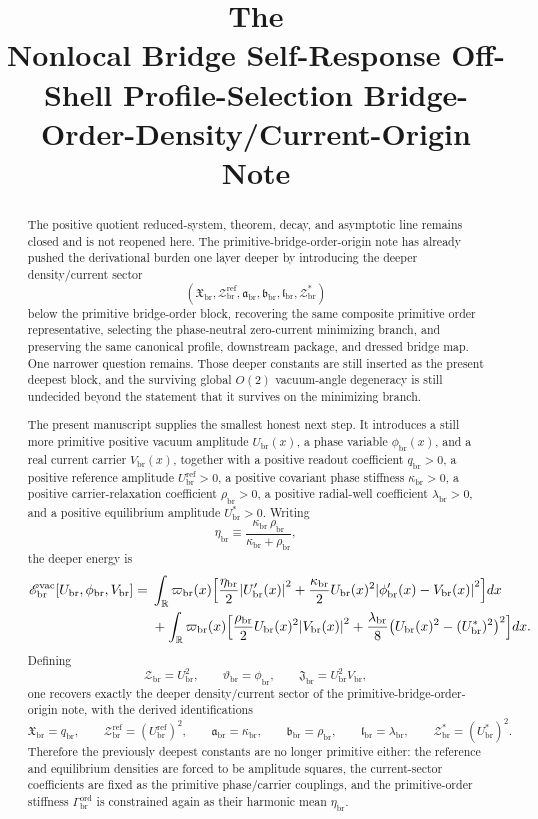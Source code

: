 \documentclass[11pt]{article}
\title{\textbf{The \TheoryName{}}\\[0.4em]
\large Nonlocal Bridge Self-Response Off-Shell Profile-Selection Bridge-Order-Density/Current-Origin Note}
\author{}
\date{}
\newcommand{\ProfWeight}{\varpi_{\mathrm{br}}}
\newcommand{\RespOrderStiff}{\Gamma_{\mathrm{br}}^{\mathrm{ord}}}
\newcommand{\RespOrderPhase}{\vartheta_{\mathrm{br}}}
\newcommand{\RespDeepDensity}{\mathcal Z_{\mathrm{br}}}
\newcommand{\RespDeepDensityRef}{\mathcal Z_{\mathrm{br}}^{\mathrm{ref}}}
\newcommand{\RespDeepDensityEq}{\mathcal Z_{\mathrm{br}}^{\ast}}
\newcommand{\RespDeepReadout}{\mathfrak X_{\mathrm{br}}}
\newcommand{\RespDeepTrack}{\mathfrak a_{\mathrm{br}}}
\newcommand{\RespDeepRelax}{\mathfrak b_{\mathrm{br}}}
\newcommand{\RespDeepWell}{\mathfrak l_{\mathrm{br}}}
\newcommand{\RespDeepAux}{\mathfrak J_{\mathrm{br}}}
\newcommand{\RespVacAmp}{U_{\mathrm{br}}}
\newcommand{\RespVacRef}{U_{\mathrm{br}}^{\mathrm{ref}}}
\newcommand{\RespVacEq}{U_{\mathrm{br}}^{\ast}}
\newcommand{\RespVacPhase}{\phi_{\mathrm{br}}}
\newcommand{\RespVacCarrier}{V_{\mathrm{br}}}
\newcommand{\RespVacReadout}{q_{\mathrm{br}}}
\newcommand{\RespVacCov}{\kappa_{\mathrm{br}}}
\newcommand{\RespVacRelax}{\rho_{\mathrm{br}}}
\newcommand{\RespVacWell}{\lambda_{\mathrm{br}}}
\newcommand{\RespVacIso}{\eta_{\mathrm{br}}}
\newcommand{\RespVacEnergy}{\mathscr E_{\mathrm{br}}^{\mathrm{vac}}}
\begin{document}
\maketitle

\begin{abstract}
The positive quotient reduced-system, theorem, decay, and asymptotic line remains closed and is not reopened here. The primitive-bridge-order-origin note has already pushed the derivational burden one layer deeper by introducing the deeper density/current sector
\[
(\RespDeepReadout,\RespDeepDensityRef,\RespDeepTrack,\RespDeepRelax,\RespDeepWell,\RespDeepDensityEq)
\]
below the primitive bridge-order block, recovering the same composite primitive order representative, selecting the phase-neutral zero-current minimizing branch, and preserving the same canonical profile, downstream package, and dressed bridge map. One narrower question remains. Those deeper constants are still inserted as the present deepest block, and the surviving global \(O(2)\) vacuum-angle degeneracy is still undecided beyond the statement that it survives on the minimizing branch.

The present manuscript supplies the smallest honest next step. It introduces a still more primitive positive vacuum amplitude \(\RespVacAmp(x)\), a phase variable \(\RespVacPhase(x)\), and a real current carrier \(\RespVacCarrier(x)\), together with a positive readout coefficient \(\RespVacReadout>0\), a positive reference amplitude \(\RespVacRef>0\), a positive covariant phase stiffness \(\RespVacCov>0\), a positive carrier-relaxation coefficient \(\RespVacRelax>0\), a positive radial-well coefficient \(\RespVacWell>0\), and a positive equilibrium amplitude \(\RespVacEq>0\). Writing
\[
\RespVacIso\equiv \frac{\RespVacCov\,\RespVacRelax}{\RespVacCov+\RespVacRelax},
\]
the deeper energy is
\begin{align*}
\RespVacEnergy[\RespVacAmp,\RespVacPhase,\RespVacCarrier]
=\;&
\int_{\mathbb R}\ProfWeight(x)\Bigl[
\frac{\RespVacIso}{2}\abs{\RespVacAmp'(x)}^2
+
\frac{\RespVacCov}{2}\RespVacAmp(x)^2\abs{\RespVacPhase'(x)-\RespVacCarrier(x)}^2
\Bigr]dx
\nonumber\\
&+
\int_{\mathbb R}\ProfWeight(x)\Bigl[
\frac{\RespVacRelax}{2}\RespVacAmp(x)^2\abs{\RespVacCarrier(x)}^2
+
\frac{\RespVacWell}{8}\bigl(\RespVacAmp(x)^2-(\RespVacEq)^2\bigr)^2
\Bigr]dx.
\end{align*}
Defining
\[
\RespDeepDensity=\RespVacAmp^2,
\qquad
\RespOrderPhase=\RespVacPhase,
\qquad
\RespDeepAux=\RespVacAmp^2\RespVacCarrier,
\]
one recovers exactly the deeper density/current sector of the primitive-bridge-order-origin note, with the derived identifications
\[
\RespDeepReadout=\RespVacReadout,
\qquad
\RespDeepDensityRef=(\RespVacRef)^2,
\qquad
\RespDeepTrack=\RespVacCov,
\qquad
\RespDeepRelax=\RespVacRelax,
\qquad
\RespDeepWell=\RespVacWell,
\qquad
\RespDeepDensityEq=(\RespVacEq)^2.
\]
Therefore the previously deepest constants are no longer primitive either: the reference and equilibrium densities are forced to be amplitude squares, the current-sector coefficients are fixed as the primitive phase/carrier couplings, and the primitive-order stiffness \(\RespOrderStiff\) is constrained again as their harmonic mean \(\RespVacIso\).


\end{abstract}
\end{document}
